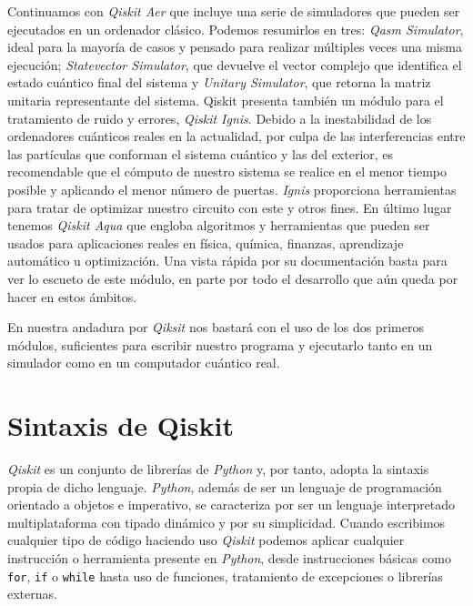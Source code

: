 Continuamos con \textit{Qiskit Aer} que incluye una serie de simuladores que pueden ser ejecutados en un ordenador clásico. Podemos resumirlos en tres: \textit{Qasm Simulator}, ideal para la mayoría de casos y pensado para realizar múltiples veces una misma ejecución; \textit{Statevector Simulator}, que devuelve el vector complejo que identifica el estado cuántico final del sistema y \textit{Unitary Simulator}, que retorna la matriz unitaria representante del sistema. Qiskit presenta también un módulo para el tratamiento de ruido y errores, \textit{Qiskit Ignis}. Debido a la inestabilidad de los ordenadores cuánticos reales en la actualidad, por culpa de las interferencias entre las partículas que conforman el sistema cuántico y las del exterior, es recomendable que el cómputo de nuestro sistema se realice en el menor tiempo posible y aplicando el menor número de puertas. \textit{Ignis} proporciona herramientas para tratar de optimizar nuestro circuito con este y otros fines. En último lugar tenemos \textit{Qiskit Aqua} que engloba algoritmos y herramientas que pueden ser usados para aplicaciones reales en física, química, finanzas, aprendizaje automático u optimización. Una vista rápida por su documentación basta para ver lo escueto de este módulo, en parte por todo el desarrollo que aún queda por hacer en estos ámbitos.

En nuestra andadura por \textit{Qiksit} nos bastará con el uso de los dos primeros módulos, suficientes para escribir nuestro programa y ejecutarlo tanto en un simulador como en un computador cuántico real.

\section{Sintaxis de Qiskit}

\textit{Qiskit} es un conjunto de librerías de \textit{Python} y, por tanto, adopta la sintaxis propia de dicho lenguaje. \textit{Python}, además de ser un lenguaje de programación orientado a objetos e imperativo, se caracteriza por ser un lenguaje interpretado multiplataforma con tipado dinámico y por su simplicidad. Cuando escribimos cualquier tipo de código haciendo uso \textit{Qiskit} podemos aplicar cualquier instrucción o herramienta presente en \textit{Python}, desde instrucciones básicas como \texttt{for}, \texttt{if} o \texttt{while} hasta uso de funciones, tratamiento de excepciones o librerías externas.

